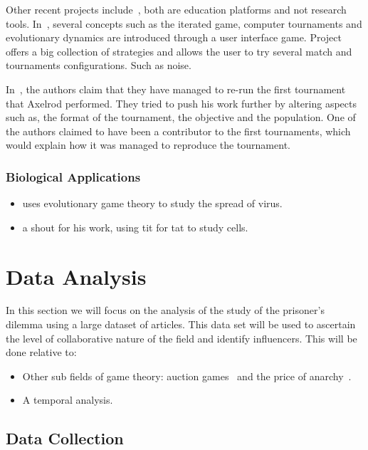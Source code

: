 \documentclass{article}
\begin{document}
Other recent projects include~\cite{pd_trust, pd_game}, both are education
platforms and not research tools. In~\cite{pd_trust}, several concepts such as
the iterated game, computer tournaments and evolutionary dynamics are introduced
through a user interface game. Project~\cite{pd_game} offers a big collection of
strategies and allows the user to try several match and tournaments configurations.
Such as noise.

In~\cite{Rapoport2015}, the authors claim that they have managed to
re-run the first tournament that Axelrod performed. They tried to push his work
further by altering aspects such as, the format of the tournament, the objective
and the population. One of the authors claimed to have been a contributor
to the first tournaments, which would explain how it was managed to reproduce
the tournament.

\subsubsection{Biological Applications}
\begin{itemize}
    \item \cite{Turner1999} uses evolutionary game theory to study the spread of
    virus.
    \item \cite{Douglas2011} a shout for his work, using tit for tat to study cells.
\end{itemize}

\section{Data Analysis}\label{section:analysis}

In this section we will focus on the analysis of the study of the prisoner's dilemma
using a large dataset of articles. This data set will be used to ascertain the level
of collaborative nature of the field and identify influencers. This will be done
relative to:

\begin{itemize}
    \item Other sub fields of game theory: auction games~\cite{menezes2005} and 
    the price of anarchy~\cite{roughgarden2005}.
    \item A temporal analysis.
\end{itemize}

\subsection{Data Collection}
\end{document}
